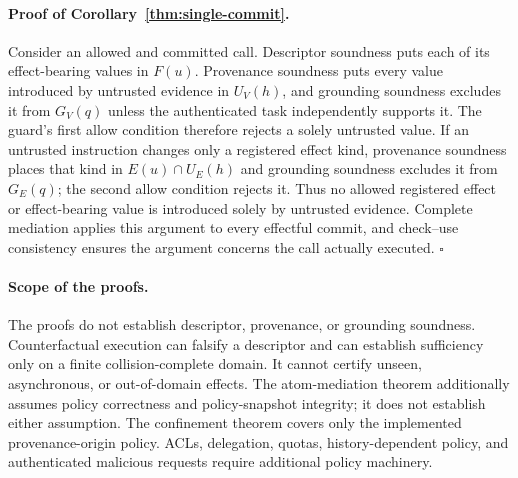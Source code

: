 \paragraph{Proof of Corollary~\ref{thm:single-commit}.}
Consider an allowed and committed call.  Descriptor soundness puts each of its
effect-bearing values in $F(u)$. Provenance soundness puts every value
introduced by untrusted evidence in $U_V(h)$, and grounding soundness excludes
it from $G_V(q)$ unless the authenticated task independently supports it.  The
guard's first allow condition therefore rejects a solely untrusted value.  If
an untrusted instruction changes only a registered effect kind, provenance
soundness places that kind in $E(u)\cap U_E(h)$ and grounding soundness excludes
it from $G_E(q)$; the second allow condition rejects it.  Thus no allowed
registered effect or effect-bearing value is introduced solely by untrusted
evidence.
Complete mediation applies this argument to every effectful commit, and
check--use consistency ensures the argument concerns the call actually
executed. \hfill$\square$

\paragraph{Scope of the proofs.}
The proofs do not establish descriptor, provenance, or grounding soundness.
Counterfactual
execution can falsify a descriptor and can establish sufficiency only on a
finite collision-complete domain. It cannot certify unseen, asynchronous, or
out-of-domain effects.  The atom-mediation theorem additionally assumes policy
correctness and policy-snapshot integrity; it does not establish either
assumption.  The confinement theorem
covers only the implemented provenance-origin policy. ACLs, delegation,
quotas, history-dependent policy,
and authenticated malicious requests require additional policy machinery.
